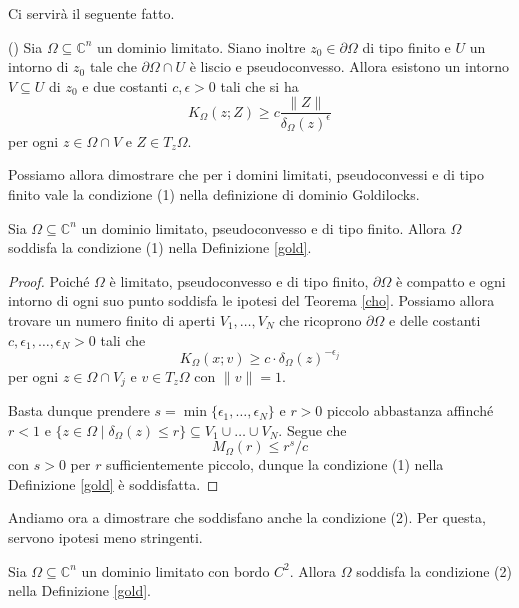 Ci servirà il seguente fatto.

\begin{thm} \label{cho}
    (\cite[Theorem 1]{C}) Sia $\Omega\subseteq\mathbb{C}^n$ un dominio limitato. Siano inoltre $z_0\in\partial\Omega$ di tipo finito e $U$ un intorno di $z_0$ tale che $\partial\Omega\cap U$ è liscio e pseudoconvesso. Allora esistono un intorno $V\subseteq U$ di $z_0$ e due costanti $c,\epsilon>0$ tali che si ha
    $$K_\Omega(z;Z) \ge c\frac{\|Z\|}{\delta_\Omega(z)^\epsilon}$$
    per ogni $z\in\Omega\cap V$ e $Z\in T_z\Omega$.
\end{thm}

Possiamo allora dimostrare che per i domini limitati, pseudoconvessi e di tipo finito vale la condizione (1) nella definizione di dominio Goldilocks.

\begin{cor} \label{finito_is_1}
    Sia $\Omega\subseteq\mathbb{C}^n$ un dominio limitato, pseudoconvesso e di tipo finito. Allora $\Omega$ soddisfa la condizione (1) nella Definizione \ref{gold}.
\end{cor}

\begin{proof}
    Poiché $\Omega$ è limitato, pseudoconvesso e di tipo finito, $\partial\Omega$ è compatto e ogni intorno di ogni suo punto soddisfa le ipotesi del Teorema \ref{cho}. Possiamo allora trovare un numero finito di aperti $V_1,\dots, V_N$ che ricoprono $\partial\Omega$ e delle costanti $c,\epsilon_1,\dots,\epsilon_N>0$ tali che
    $$K_\Omega(x;v) \ge c\cdot\delta_\Omega(z)^{-\epsilon_j}$$
    per ogni $z\in\Omega\cap V_j$ e $v\in T_z\Omega$ con $\|v\|=1$.

    Basta dunque prendere $s=\min\{\epsilon_1,\dots,\epsilon_N\}$ e $r>0$ piccolo abbastanza affinché $r<1$ e $\{z\in\Omega\mid\delta_\Omega(z) \le r\}\subseteq V_1\cup\dots\cup V_N$. Segue che
    $$M_\Omega(r) \le r^s/c$$
    con $s>0$ per $r$ sufficientemente piccolo, dunque la condizione (1) nella Definizione \ref{gold} è soddisfatta.
\end{proof}

Andiamo ora a dimostrare che soddisfano anche la condizione (2). Per questa, servono ipotesi meno stringenti.

\begin{prop} \label{finito_is_2}
    Sia $\Omega\subseteq\mathbb{C}^n$ un dominio limitato con bordo $C^2$. Allora $\Omega$ soddisfa la condizione (2) nella Definizione \ref{gold}.
\end{prop}

